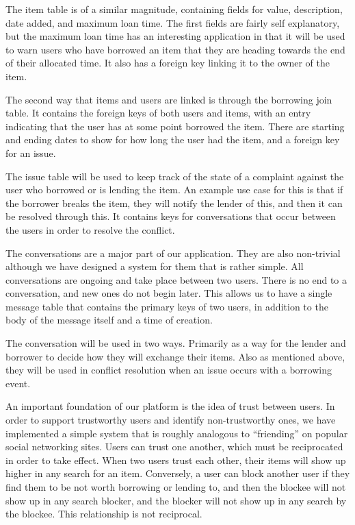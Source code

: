 \documentclass{acm_proc_article-sp}
\begin{document}
The item table is of a similar magnitude, containing fields for value, description, date added, and maximum loan time. The first fields are fairly self explanatory, but the maximum loan time has an interesting application in that it will be used to warn users who have borrowed an item that they are heading towards the end of their allocated time. It also has a foreign key linking it to the owner of the item.

The second way that items and users are linked is through the borrowing join table. It contains the foreign keys of both users and items, with an entry indicating that the user has at some point borrowed the item. There are starting and ending dates to show for how long the user had the item, and a foreign key for an issue.

The issue table will be used to keep track of the state of a complaint against the user who borrowed or is lending the item. An example use case for this is that if the borrower breaks the item, they will notify the lender of this, and then it can be resolved through this. It contains keys for conversations that occur between the users in order to resolve the conflict.

The conversations are a major part of our application. They are also non-trivial although we have designed a system for them that is rather simple. All conversations are ongoing and take place between two users. There is no end to a conversation, and new ones do not begin later. This allows us to have a single message table that contains the primary keys of two users, in addition to the body of the message itself and a time of creation.

The conversation will be used in two ways. Primarily as a way for the lender and borrower to decide how they will exchange their items. Also as mentioned above, they will be used in conflict resolution when an issue occurs with a borrowing event.

An important foundation of our platform is the idea of trust between users. In order to support trustworthy users and identify non-trustworthy ones, we have implemented a simple system that is roughly analogous to ``friending'' on popular social networking sites. Users can trust one another, which must be reciprocated in order to take effect. When two users trust each other, their items will show up higher in any search for an item. Conversely, a user can block another user if they find them to be not worth borrowing or lending to, and then the blockee will not show up in any search blocker, and the blocker will not show up in any search by the blockee. This relationship is not reciprocal.
\end{document}
